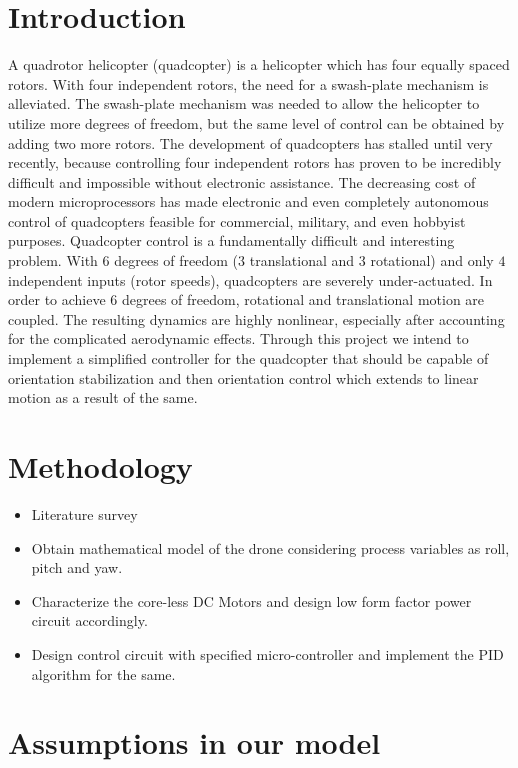 \documentclass[9pt]{article}
\begin{document}
\section{Introduction}

A quadrotor helicopter (quadcopter) is a helicopter which has four equally spaced rotors. With four independent rotors, the need for a swash-plate mechanism is alleviated. The swash-plate mechanism was needed to allow the helicopter to utilize more degrees of freedom, but the same level of control can be obtained by adding two more rotors. The development of quadcopters has stalled until very recently, because controlling four independent rotors has proven to be incredibly difficult and impossible without electronic assistance. The decreasing cost of modern microprocessors has made electronic and even completely autonomous control of quadcopters feasible for commercial, military, and even hobbyist purposes. Quadcopter control is a fundamentally difficult and interesting problem. With $6$ degrees of freedom ($3$ translational and $3$ rotational) and only $4$ independent inputs (rotor speeds), quadcopters are severely under-actuated. In order to achieve $6$ degrees of freedom, rotational and translational motion are coupled. The resulting dynamics are highly nonlinear, especially after accounting for the complicated aerodynamic effects. Through this project we intend to implement a simplified controller for the quadcopter that should be capable of orientation stabilization and then orientation control which extends to linear motion as a result of the same.  

\section{Methodology}

\begin{itemize}
\item Literature survey
\item Obtain mathematical model of the drone considering process variables as roll, pitch and yaw.
\item Characterize the core-less DC Motors and design low form factor power circuit accordingly.
\item Design control circuit with specified micro-controller and implement the PID algorithm for the same.
\end{itemize}

\section{Assumptions in our model}
\end{document}

